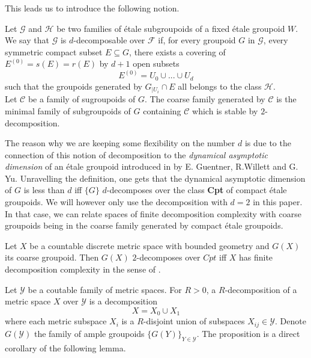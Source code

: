 This leads us to introduce the following notion.

\begin{definition}
Let $\mathcal G$ and $\mathcal H$ be two families of \'etale subgroupoids of a fixed \'etale groupoid $W$. \\

We say that $\mathcal G$ is $d$-decomposable over $\mathcal F$ if, for every groupoid $G$ in $\mathcal G$, every symmetric compact subset $E\subseteq G$, there exists a covering of $E^{(0)} = s(E)=r(E)$ by $d+1$ open subsets 
\[E^{(0)} = U_0 \cup ... \cup U_d \] such that the groupoids generated by $G_{|U_i} \cap E$ all belongs to the class $\mathcal H$.\\

Let $\mathcal C$ be a family of sugroupoids of $G$. The coarse family generated by $\mathcal C$ is the minimal family of subgroupoids of $G$ containing $\mathcal C$ which is stable by $2$-decomposition.
\end{definition}

The reason why we are keeping some flexibility on the number $d$ is due to the connection of this notion of decomposition to the \textit{dynamical asymptotic dimension} of an \'etale groupoid introduced in \cite{GWY} by E. Guentner, R.Willett and G. Yu. Unravelling the definition, one gets that the dynamical asymptotic dimension of $G$ is less than $d$ iff $\{G\}$ $d$-decomposes over the class \textbf{Cpt} of compact \'etale groupoids. We will however only use the decomposition with $d=2$ in this paper. In that case, we can relate spaces of finite decomposition complexity with coarse groupoids being in the coarse family generated by compact \'etale groupoids.

\begin{prop}
Let $X$ be a countable discrete metric space with bounded geometry and $G(X)$ its coarse groupoid. Then $G(X)$ $2$-decomposes over $Cpt$ iff $X$ has finite decomposition complexity in the sense of \cite{GuentnerTesseraYu}.
\end{prop}

Let $\mathcal Y$ be a coutable family of metric spaces. For $R>0$, a $R$-decomposition of a metric space $X$ over $\mathcal Y$ is a decomposition \[X = X_0 \cup X_1\]
where each metric subspace $X_i$ is a $R$-disjoint union of subspaces $X_{ij}\in \mathcal Y$. Denote $G(\mathcal Y)$ the family of ample groupoids $\{G(Y)\}_{Y\in \mathcal Y}$. The proposition is a direct corollary of the following lemma.

